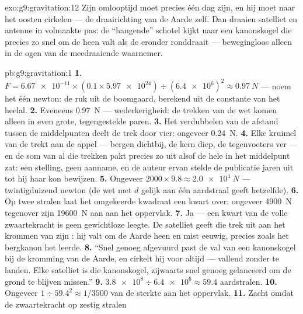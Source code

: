 \begin{solution}{exo:g9:gravitation:12}
Zijn omlooptijd moet precies één dag zijn, en hij moet naar het oosten
cirkelen --- de draairichting van de Aarde zelf. Dan draaien satelliet
en antenne in volmaakte pas: de ``hangende'' schotel kijkt naar een
kanonskogel die precies zo snel om de  heen valt als de
 eronder ronddraait --- bewegingloos alleen in de ogen van
de meedraaiende waarnemer.
\end{solution}

\begin{solution}{pb:g9:gravitation:1}
\textbf{1.} $F = \num{6.67e-11} \times (0.1 \times \num{5.97e24}) \div
(\num{6.4e6})^2 \approx \qty{0.97}{N}$ --- noem het één newton: de ruk
uit de boomgaard, berekend uit de constante van het heelal.
\textbf{2.} Eveneens \qty{0.97}{N} --- wederkerigheid: de trekken van de
wet komen alleen in even grote, tegengestelde paren.
\textbf{3.} Het verdubbelen van de afstand tussen de middelpunten
deelt de trek door vier: ongeveer \qty{0.24}{N}.
\textbf{4.} Elke kruimel van de  trekt aan de appel ---
bergen dichtbij, de kern diep, de tegenvoeters ver --- en de som van al
die trekken pakt precies zo uit alsof de hele  in het
middelpunt zat: een stelling, geen aanname, en de auteur ervan stelde de
publicatie jaren uit tot hij haar kon bewijzen.
\textbf{5.} Ongeveer $2000 \times 9.8 \approx \qty{2.0e4}{N}$ ---
twintigduizend newton (de wet met $d$ gelijk aan één aardstraal geeft
hetzelfde).
\textbf{6.} Op twee stralen laat het omgekeerde kwadraat een kwart
over: ongeveer \qty{4900}{N} tegenover zijn \qty{19600}{N} aan
 aan het oppervlak.
\textbf{7.} Ja --- een kwart van de volle zwaartekracht is geen
gewichtloze leegte. De satelliet geeft die trek uit aan het krommen van
zijn : hij valt om de Aarde heen en mist eeuwig, precies zoals het
bergkanon het leerde.
\textbf{8.} ``Snel genoeg afgevuurd past de val van een kanonskogel bij
de kromming van de Aarde, en cirkelt hij voor altijd --- vallend zonder
te landen. Elke satelliet is die kanonskogel, zijwaarts snel genoeg
gelanceerd om de grond te blijven missen.''
\textbf{9.} $\num{3.8e8} \div \num{6.4e6} \approx 59.4$ aardstralen.
\textbf{10.} Ongeveer $1 \div 59.4^2 \approx 1/3500$ van de sterkte aan
het oppervlak.
\textbf{11.} Zacht omdat de zwaartekracht op zestig stralen

\end{solution}
